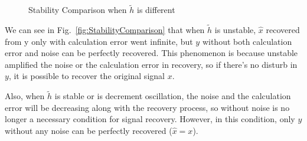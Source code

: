 \documentclass{article}
\begin{document}
\begin{figure}[!h]
	\centering
	\hspace{0 pt}
	\caption{Stability Comparison when $\tilde{h}$ is different}
	\label{fig:Comparison}
\end{figure}

We can see in Fig.~\ref{fig:StabilityComparison} that when $\tilde{h}$ is unstable, $\hat{x}$ recovered from y only with calculation error went infinite, but $y$ without both calculation error and noise can be perfectly recovered. This phenomenon is because unstable amplified the noise or the calculation error in recovery, so if there's no disturb in $y$, it is possible to recover the original signal $x$.

Also, when $\tilde{h}$ is stable or is decrement oscillation, the noise and the calculation error will be decreasing along with the recovery process, so without noise is no longer a necessary condition for signal recovery. However, in this condition, only $y$ without any noise can be perfectly recovered ($\hat{x} = x$).



\end{document}
